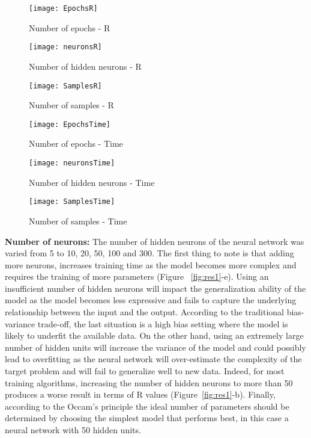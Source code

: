 \documentclass[conference,compsoc]{IEEEtran}
\begin{document}
    \begin{figure*}[]
    
        \begin{subfigure}{0.33\linewidth}
            \texttt{[image: EpochsR]}
            \caption{Number of epochs - R}
        \end{subfigure}
        \begin{subfigure}{0.33\linewidth}
            \texttt{[image: neuronsR]}
            \caption{Number of hidden neurons - R}
        \end{subfigure}
        \begin{subfigure}{0.33\linewidth}
            \texttt{[image: SamplesR]}
            \caption{Number of samples - R}
        \end{subfigure}


		\begin{subfigure}{0.33\linewidth}
            \texttt{[image: EpochsTime]}
            \caption{Number of epochs - Time}
        \end{subfigure}
        \begin{subfigure}{0.33\linewidth}
            \texttt{[image: neuronsTime]}
            \caption{Number of hidden neurons - Time}
        \end{subfigure}
        \begin{subfigure}{0.33\linewidth}
            \texttt{[image: SamplesTime]}
            \caption{Number of samples - Time}
        \end{subfigure}
   	
        \caption{ Varying the effect of various parameters and measuring performance in terms of R value and training time.}       
   
        
        \label{fig:res1}
    \end{figure*}
\textbf{Number of neurons:} The number of hidden neurons of the neural network was varied from 5 to 10, 20, 50, 100 and 300. The first thing to note is that adding more neurons, increases training time as the model becomes more complex and requires the training of more parameters (Figure ~\ref{fig:res1}-e). Using an insufficient number of hidden neurons will impact the generalization ability of the model as the model becomes less expressive and fails to capture the underlying relationship between the input and the output. According to the traditional bias-variance trade-off, the last situation is a high bias setting where the model is likely to underfit the available data. On the other hand, using an extremely large number of hidden units will increase the variance of the model and could possibly lead to overfitting as the neural network will over-estimate the complexity of the target problem and will fail to generalize well to new data. Indeed, for most training algorithms, increasing the number of hidden neurons to more than 50 produces a worse result in terms of R values (Figure~\ref{fig:res1}-b). Finally, according to the Occam's principle the ideal number of parameters should be determined by choosing the simplest model that performs best, in this case a neural network with 50 hidden units. 
\end{document}
